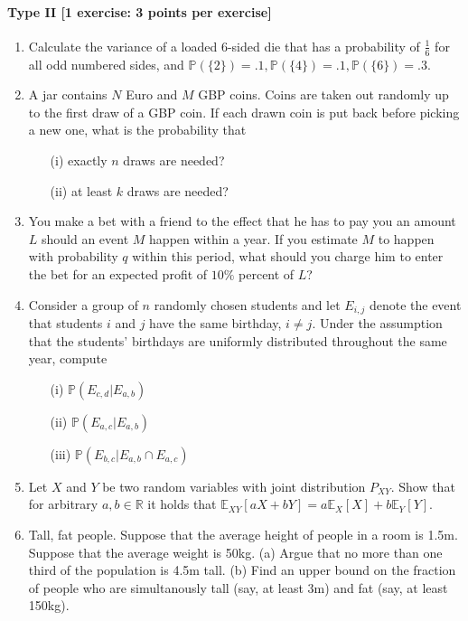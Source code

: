 \documentclass{article}
\newcommand{\E}{\mathbb{E}}
\begin{document}
\paragraph{Type II [1 exercise: 3 points per exercise]}
\begin{enumerate}
\item Calculate the variance of a loaded 6-sided die that has a probability of $\frac{1}{6}$ for all odd numbered sides, and $\mathbb{P}(\{2\}) = .1,  \mathbb{P}(\{4\}) = .1, \mathbb{P}(\{6\}) = .3$.
	\item A jar contains $N$ Euro and $M$ GBP coins. Coins are taken out randomly up to the first draw of a GBP coin. If each drawn coin is put back before picking a new one, what is the probability that
		\begin{itemize}
			\item[(i)] exactly $n$ draws are needed?
			\item[(ii)] at least $k$ draws are needed?
		\end{itemize}
	\item You make a bet with a friend to the effect that he has to pay you an amount $L$ should an event $M$ happen within a year. If you estimate $M$ to happen with probability $q$ within this period, what should you charge him to enter the bet for an expected profit of $10\%$ percent of $L$?
	\item Consider a group of $n$ randomly chosen students and let $E_{i,j}$ denote the event that students $i$ and $j$ have the same birthday, $i \neq j$. Under the assumption that the students' birthdays are uniformly distributed throughout the same year, compute
		\begin{itemize}
			\item[(i)] $\mathbb{P}(E_{c,d}|E_{a,b})$
			\item[(ii)] $\mathbb{P}(E_{a,c}|E_{a,b})$
			\item[(iii)] $\mathbb{P}(E_{b,c}|E_{a,b} \cap E_{a,c})$
		\end{itemize}
	\item Let $X$ and $Y$ be two random variables with joint distribution $P_{XY}$. Show that for arbitrary 		$a,b \in \mathbb{R}$ it holds that $\E_{XY}[aX + bY] = a \E_X[X] + b \E_Y[Y].$
	\item Tall, fat people. Suppose that the average height of people in a room is 1.5m. Suppose that the average weight is 50kg.
(a) Argue that no more than one third of the population is 4.5m tall.
(b) Find an upper bound on the fraction of people who are simultanously tall (say, at least 3m) and fat (say, at least 150kg).
\end{enumerate}
\end{document}

